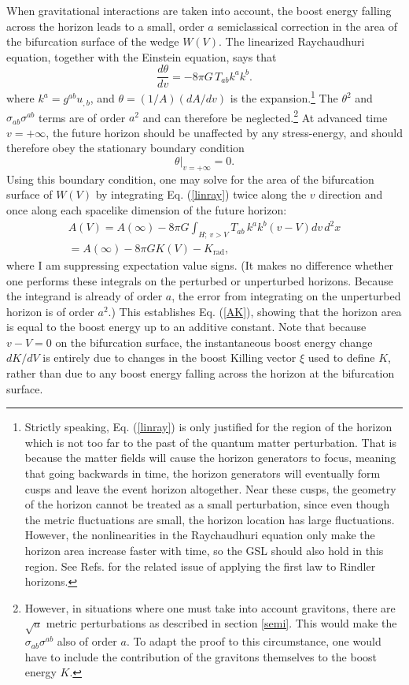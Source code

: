 \documentclass{article}
\begin{document}
When gravitational interactions are taken into account, the boost energy falling across the horizon leads to a small, order $a$ semiclassical correction in the area of the bifurcation surface of the wedge $W(V)$.  The linearized Raychaudhuri equation, together with the Einstein equation, says that
\begin{equation}\label{linray}
\frac{d \theta }{dv} = -8\pi G\,T_{ab} k^a k^b.
\end{equation}
where $k^a = g^{ab} u_{,b}$, and $\theta = (1/A)(dA/dv)$ is the expansion.\footnote{Strictly speaking, Eq. (\ref{linray}) is only justified for the region of the horizon which is not too far to the past of the quantum matter perturbation.  That is because the matter fields will cause the horizon generators to focus, meaning that going backwards in time, the horizon generators will eventually form cusps and leave the event horizon altogether.  Near these cusps, the geometry of the horizon cannot be treated as a small perturbation, since even though the metric fluctuations are small, the horizon location has large fluctuations.  However, the nonlinearities in the Raychaudhuri equation only make the horizon area increase faster with time, so the GSL should also hold in this region.  See Refs. \cite{JP07}\cite{AMV08} for the related issue of applying the first law to Rindler horizons.}  The $\theta^2$ and $\sigma_{ab}\sigma^{ab}$ terms are of order $a^2$ and can therefore be neglected.\footnote{However, in situations where one must take into account gravitons, there are $\sqrt{a}$ metric perturbations as described in section \ref{semi}.  This would make the $\sigma_{ab}\sigma^{ab}$ also of order $a$.  To adapt the proof to this circumstance, one would have to include the contribution of the gravitons themselves to the boost energy $K$.}  At advanced time $v = +\infty$, the future horizon should be unaffected by any stress-energy, and should therefore obey the stationary boundary condition
\begin{equation}
\theta|_{v=+\infty} = 0.
\end{equation}
Using this boundary condition, one may solve for the area of the bifurcation surface of $W(V)$ by integrating Eq. (\ref{linray}) twice along the $v$ direction and once along each spacelike dimension of the future horizon:
\begin{eqnarray}
A(V)= A(\infty) - 8\pi G \int_{H;\,v > V} T_{ab} \, k^a k^b (v - V) dv\,d^2x \\
= A(\infty) - 8\pi G K(V) - K_\mathrm{rad},
\end{eqnarray}
where I am suppressing expectation value signs.  (It makes no difference whether one performs these integrals on the perturbed or unperturbed horizons.  Because the integrand is already of order $a$, the error from integrating on the unperturbed horizon is of order $a^2$.)  This establishes Eq. (\ref{AK}), showing that the horizon area is equal to the boost energy up to an additive constant.  Note that because $v - V = 0$ on the bifurcation surface, the instantaneous boost energy change $dK/dV$ is entirely due to changes in the boost Killing vector $\xi$ used to define $K$, rather than due to any boost energy falling across the horizon at the bifurcation surface.
\end{document}
